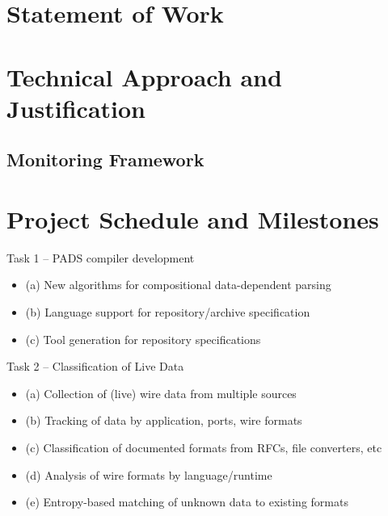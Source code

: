 \documentclass[12pt]{article}
\begin{document}
\section{Statement of Work}



\newpage

\section{Technical Approach and Justification}







\subsection{Monitoring Framework}








\newpage
\section{Project Schedule and Milestones}

Task 1 -- PADS compiler development
\begin{itemize}
\item (a) New algorithms for compositional data-dependent parsing
\item (b) Language support for repository/archive specification
\item (c) Tool generation for repository specifications
\end{itemize}

Task 2 -- Classification of Live Data
\begin{itemize}
\item (a) Collection of (live) wire data from multiple sources
\item (b) Tracking of data by application, ports, wire formats
\item (c) Classification of documented formats from RFCs, file converters, etc
\item (d) Analysis of wire formats by language/runtime 
\item (e) Entropy-based matching of unknown data to existing formats
\end{itemize}
\end{document}
